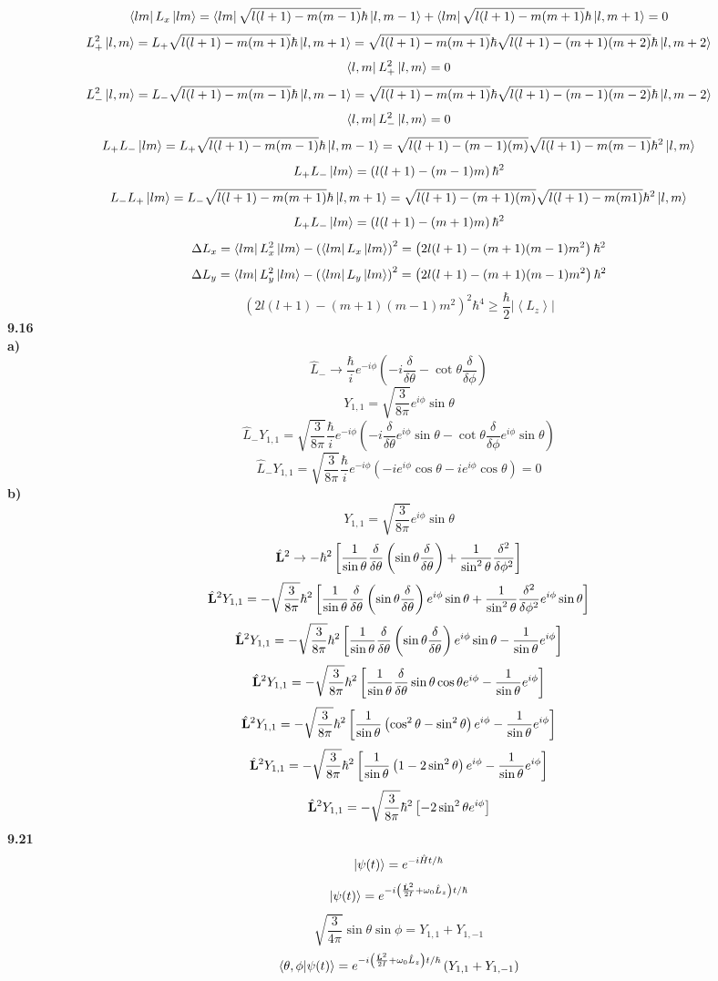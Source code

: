 \documentclass[english]{article}
\begin{document}
$$\bra{lm}L_x\ket{lm}=\bra{lm}\sqrt{l(l+1)-m(m-1)}\hbar\ket{l,m-1}+\bra{lm}\sqrt{l(l+1)-m(m+1)}\hbar\ket{l,m+1}=0$$
$$L_+^2\ket{l,m}=L_+\sqrt{l(l+1)-m(m+1)}\hbar\ket{l,m+1}=\sqrt{l(l+1)-m(m+1)}\hbar\sqrt{l(l+1)-(m+1)(m+2)}\hbar\ket{l,m+2}$$
$$\bra{l,m}L_+^2\ket{l,m}=0$$
$$L_-^2\ket{l,m}=L_-\sqrt{l(l+1)-m(m-1)}\hbar\ket{l,m-1}=\sqrt{l(l+1)-m(m+1)}\hbar\sqrt{l(l+1)-(m-1)(m-2)}\hbar\ket{l,m-2}$$
$$\bra{l,m}L_-^2\ket{l,m}=0$$
$$L_+L_-\ket{lm}=L_+\sqrt{l(l+1)-m(m-1)}\hbar\ket{l,m-1}=\sqrt{l(l+1)-(m-1)(m)}\sqrt{l(l+1)-m(m-1)}\hbar^2\ket{l,m}$$
$$L_+L_-\ket{lm}=\left(l(l+1)-(m-1)m\right)\hbar^2$$
$$L_-L_+\ket{lm}=L_-\sqrt{l(l+1)-m(m+1)}\hbar\ket{l,m+1}=\sqrt{l(l+1)-(m+1)(m)}\sqrt{l(l+1)-m(m1)}\hbar^2\ket{l,m}$$
$$L_+L_-\ket{lm}=\left(l(l+1)-(m+1)m\right)\hbar^2$$
$$\Delta L_x=\bra{lm}L_x^2\ket{lm}-\left(\bra{lm}L_x\ket{lm}\right)^2=\left(2l(l+1)-(m+1)(m-1)m^2\right)\hbar^2$$
$$\Delta L_y=\bra{lm}L_y^2\ket{lm}-\left(\bra{lm}L_y\ket{lm}\right)^2=\left(2l(l+1)-(m+1)(m-1)m^2\right)\hbar^2$$
$$\left(2l(l+1)-(m+1)(m-1)m^2\right)^2\hbar^4\geq\frac{\hbar}{2}\left|\left\langle L_z\right\rangle\right|$$
\noindent
\textbf{9.16}\\
\textbf{a)}
$$\hat{L}_-\rightarrow\frac{\hbar}{i}e^{-i\phi}\left(-i\frac{\delta}{\delta\theta}-\cot\theta\frac{\delta}{\delta\phi}\right)$$
$$Y_{1,1}=\sqrt{\frac{3}{8\pi}}e^{i\phi}\sin\theta$$
$$\hat{L}_-Y_{1,1}=\sqrt{\frac{3}{8\pi}}\frac{\hbar}{i}e^{-i\phi}\left(-i\frac{\delta}{\delta\theta}e^{i\phi}\sin\theta-\cot\theta\frac{\delta}{\delta\phi}e^{i\phi}\sin\theta\right)$$
$$\hat{L}_-Y_{1,1}=\sqrt{\frac{3}{8\pi}}\frac{\hbar}{i}e^{-i\phi}\left(-ie^{i\phi}\cos\theta-ie^{i\phi}\cos\theta\right)=0$$
\textbf{b)}
$$Y_{1,1}=\sqrt{\frac{3}{8\pi}}e^{i\phi}\sin\theta$$
$$\hat{\vb{L}}^2\rightarrow-\hbar^2\left[\frac{1}{\sin\theta}\frac{\delta}{\delta\theta}\left(\sin\theta\frac{\delta}{\delta\theta}\right)+\frac{1}{\sin^2\theta}\frac{\delta^2}{\delta\phi^2}\right]$$
$$\hat{\vb{L}}^2Y_{1,1}=-\sqrt{\frac{3}{8\pi}}\hbar^2\left[\frac{1}{\sin\theta}\frac{\delta}{\delta\theta}\left(\sin\theta\frac{\delta}{\delta\theta}\right)e^{i\phi}\sin\theta+\frac{1}{\sin^2\theta}\frac{\delta^2}{\delta\phi^2}e^{i\phi}\sin\theta\right]$$
$$\hat{\vb{L}}^2Y_{1,1}=-\sqrt{\frac{3}{8\pi}}\hbar^2\left[\frac{1}{\sin\theta}\frac{\delta}{\delta\theta}\left(\sin\theta\frac{\delta}{\delta\theta}\right)e^{i\phi}\sin\theta-\frac{1}{\sin\theta}e^{i\phi}\right]$$
$$\hat{\vb{L}}^2Y_{1,1}=-\sqrt{\frac{3}{8\pi}}\hbar^2\left[\frac{1}{\sin\theta}\frac{\delta}{\delta\theta}\sin\theta\cos\theta e^{i\phi}-\frac{1}{\sin\theta}e^{i\phi}\right]$$
$$\hat{\vb{L}}^2Y_{1,1}=-\sqrt{\frac{3}{8\pi}}\hbar^2\left[\frac{1}{\sin\theta}\left(\cos^2\theta-\sin^2\theta\right) e^{i\phi}-\frac{1}{\sin\theta}e^{i\phi}\right]$$
$$\hat{\vb{L}}^2Y_{1,1}=-\sqrt{\frac{3}{8\pi}}\hbar^2\left[\frac{1}{\sin\theta}\left(1-2\sin^2\theta\right) e^{i\phi}-\frac{1}{\sin\theta}e^{i\phi}\right]$$
$$\hat{\vb{L}}^2Y_{1,1}=-\sqrt{\frac{3}{8\pi}}\hbar^2\left[-2\sin^2\theta e^{i\phi}\right]$$
\noindent
\textbf{9.21}
$$\ket{\psi(t)}=e^{-i\hat{H}t/\hbar}$$
$$\ket{\psi(t)}=e^{-i\left(\frac{\hat{\vb{L}}^2}{2I}+\omega_0\hat{L}_z\right)t/\hbar}$$
$$\sqrt{\frac{3}{4\pi}}\sin\theta\sin\phi=Y_{1,1}+Y_{1,-1}$$
$$\bra{\theta,\phi}\ket{\psi(t)}=e^{-i\left(\frac{\hat{\vb{L}}^2}{2I}+\omega_0\hat{L}_z\right)t/\hbar}\left(Y_{1,1}+Y_{1,-1}\right)$$
\end{document}
